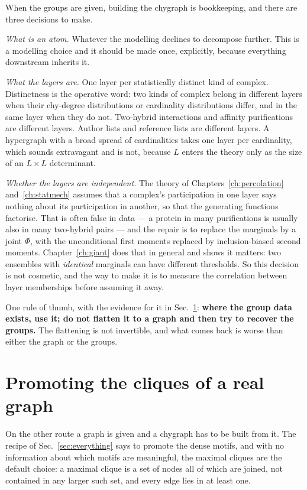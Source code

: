 When the groups are given, building the chygraph is bookkeeping, and there are
three decisions to make.

\emph{What is an atom.} Whatever the modelling declines to decompose further.
This is a
modelling choice and it should be made once, explicitly, because everything
downstream inherits it.

\emph{What the layers are.} One layer per statistically distinct kind of
complex. Distinctness is the operative word: two kinds of complex belong in
different layers when their chy-degree distributions or cardinality
distributions differ, and in the same layer when they do not. Two-hybrid
interactions and affinity purifications are different layers. Author lists and
reference lists are different layers. A hypergraph with a broad spread of
cardinalities takes one layer per cardinality, which sounds extravagant and is
not, because $L$ enters the theory only as the size of an $L\times L$
determinant.

\emph{Whether the layers are independent.} The theory of
Chapters~\ref{ch:percolation} and~\ref{ch:statmech} assumes that a complex's
participation in one layer says nothing about its participation in another,
so that the generating functions factorise. That is often false in data --- a
protein in many purifications is usually also in many two-hybrid pairs --- and
the repair is to replace the marginals by a joint $\Phi$, with the
unconditional first moments replaced by inclusion-biased second moments.
Chapter~\ref{ch:giant} does that in general and shows it matters: two ensembles
with \emph{identical} marginals can have different thresholds. So this decision
is not cosmetic, and the way to make it is to measure the correlation between
layer memberships before assuming it away.

One rule of thumb, with the evidence for it in Sec.~\ref{sec:promoting}:
\textbf{where the group data exists, use it; do not flatten it to a graph and
then try to recover the groups.} The flattening is not invertible, and what
comes back is worse than either the graph or the groups.

\section{Promoting the cliques of a real graph}
\label{sec:promoting}

On the other route a graph is given and a chygraph has to be built from it. The
recipe of
Sec.~\ref{sec:everything} says to promote the dense motifs, and with no
information about which motifs are meaningful, the maximal cliques are the
default choice: a maximal clique is a set of nodes all of which are joined, not
contained in any larger such set, and every edge lies in at least one.

